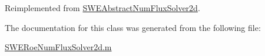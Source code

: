 Reimplemented from \hyperlink{class_s_w_e_abstract_num_flux_solver2d_aed92f39bab30c4d341979d87cd169108}{S\+W\+E\+Abstract\+Num\+Flux\+Solver2d}.



The documentation for this class was generated from the following file\+:\begin{DoxyCompactItemize}
\item 
\hyperlink{_s_w_e_roe_num_flux_solver2d_8m}{S\+W\+E\+Roe\+Num\+Flux\+Solver2d.\+m}\end{DoxyCompactItemize}
